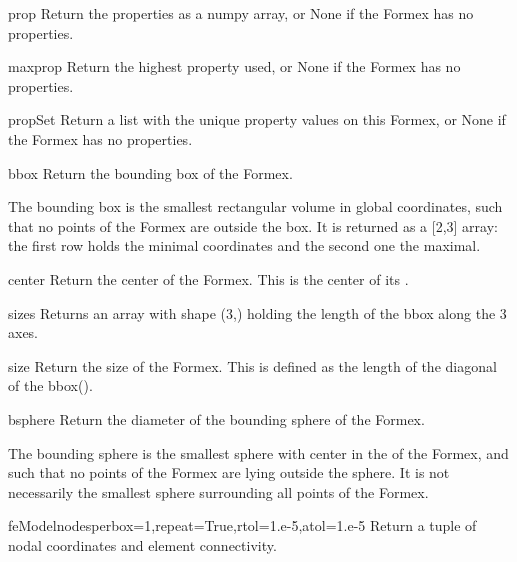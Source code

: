 {{\begin{methoddesc}{prop}{}
Return the properties as a numpy array, or None if the Formex has no properties.
\end{methoddesc}

\begin{methoddesc}{maxprop}{}
Return the highest property used, or None if the Formex has no properties.
\end{methoddesc}

\begin{methoddesc}{propSet}{}
Return a list with the unique property values on this Formex, or None if the Formex has no properties.
\end{methoddesc}


\begin{methoddesc}{bbox}{}
Return the bounding box of the Formex.

The bounding box is the smallest rectangular volume in global coordinates, such that no points of the Formex are outside the box. It is returned as a [2,3] array: the first row holds the minimal coordinates and the second one the maximal.
\end{methoddesc}

\begin{methoddesc}{center}{}
Return the center of the Formex. This is the center of its .
\end{methoddesc}

\begin{methoddesc}{sizes}{}
Returns an array with shape (3,) holding the length of the bbox along the 3 axes.
\end{methoddesc}

\begin{methoddesc}{size}{}
Return the size of the Formex. This is defined as the length of the diagonal of the bbox().
\end{methoddesc}

\begin{methoddesc}{bsphere}{}
Return the diameter of the bounding sphere of the Formex.

The bounding sphere is the smallest sphere with center in the  of the Formex, and such that no points of the Formex are lying outside the sphere. It is not necessarily the smallest sphere surrounding all points of the Formex.
\end{methoddesc}

\begin{methoddesc}{feModel}{nodesperbox=1,repeat=True,rtol=1.e-5,atol=1.e-5}
Return a tuple of nodal coordinates and element connectivity.


\end{methoddesc}}}
